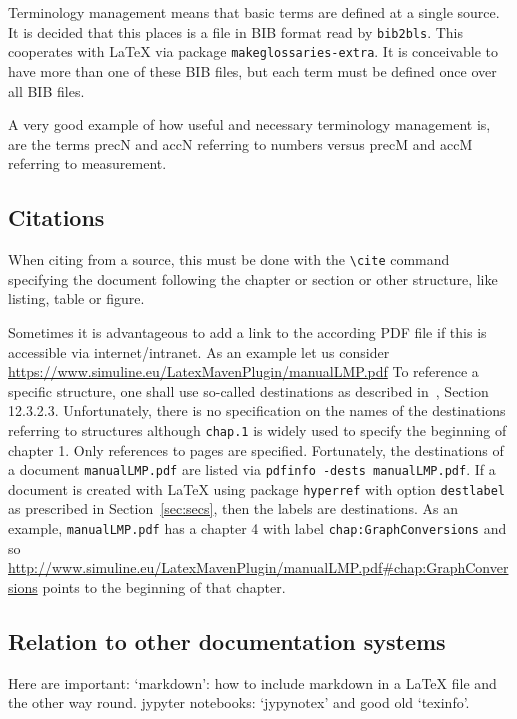 \documentclass[a4paper,12pt]{article}
\begin{document}
Terminology management means that basic terms are defined at a single source. 
It is decided that this places is a file in BIB format read by \texttt{bib2bls}. 
This cooperates with \LaTeX{} via package \texttt{makeglossaries-extra}. 
It is conceivable to have more than one of these BIB files, 
but each term must be defined once over all BIB files. 

A very good example of how useful and necessary terminology management is, 
are the terms \gls{precN} and \gls{accN} referring to numbers 
versus \gls{precM} and \gls{accM} referring to measurement. 

\subsection{Citations}

When citing from a source, this must be done with the \texttt{\textbackslash cite} 
command specifying the document following the chapter or section or other structure, 
like listing, table or figure. 

Sometimes it is advantageous to add a link to the according PDF file 
if this is accessible via internet/intranet. 
As an example let us consider \url{https://www.simuline.eu/LatexMavenPlugin/manualLMP.pdf}
To reference a specific structure, 
one shall use so-called destinations as described in~\cite{Pdf17}, 
Section 12.3.2.3. 
Unfortunately, there is no specification on the names of the destinations 
referring to structures 
although \texttt{chap.1} is widely used to specify the beginning of chapter 1. 
Only references to pages are specified. 
Fortunately, the destinations of a document \texttt{manualLMP.pdf} 
are listed via \texttt{pdfinfo -dests manualLMP.pdf}. 
If a document is created with \LaTeX{} using package \texttt{hyperref} 
with option \texttt{destlabel} as prescribed in Section~\ref{sec:secs}, 
then the labels are destinations. 
As an example, \texttt{manualLMP.pdf} has a chapter 4 with label \texttt{chap:GraphConversions}
and so \url{http://www.simuline.eu/LatexMavenPlugin/manualLMP.pdf#chap:GraphConversions} 
points to the beginning of that chapter. 

\subsection{Relation to other documentation systems}

Here are important: 
`markdown': how to include markdown in a \LaTeX{} file and the other way round. 
jypyter notebooks: `jypynotex'
and good old `texinfo'. 



\printunsrtglossaries%

\end{document}
